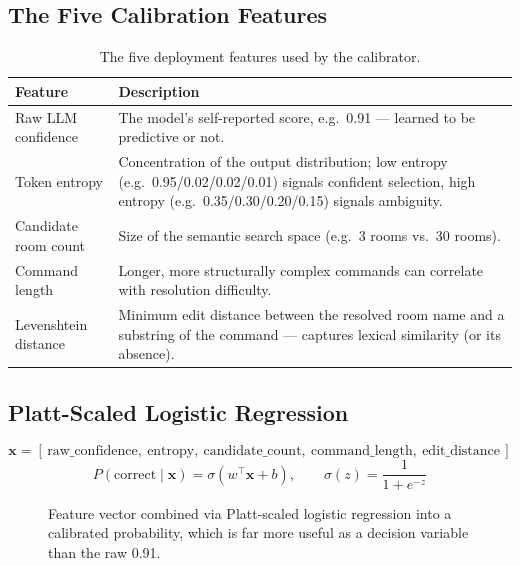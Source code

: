 \documentclass[11pt,a4paper]{article}
\begin{document}
\subsection{The Five Calibration Features}

\begin{table}[h]
\centering
\begin{tabular}{@{}p{3.2cm}p{9.6cm}@{}}
\toprule
\textbf{Feature} & \textbf{Description} \\
\midrule
Raw LLM confidence & The model's self-reported score, e.g.\ 0.91 --- learned to be predictive or not. \\
Token entropy & Concentration of the output distribution; low entropy (e.g.\ 0.95/0.02/0.02/0.01) signals confident selection, high entropy (e.g.\ 0.35/0.30/0.20/0.15) signals ambiguity. \\
Candidate room count & Size of the semantic search space (e.g.\ 3 rooms vs.\ 30 rooms). \\
Command length & Longer, more structurally complex commands can correlate with resolution difficulty. \\
Levenshtein distance & Minimum edit distance between the resolved room name and a substring of the command --- captures lexical similarity (or its absence). \\
\bottomrule
\end{tabular}
\caption{The five deployment features used by the calibrator.}
\end{table}

\subsection{Platt-Scaled Logistic Regression}

\[
\mathbf{x} = [\,\text{raw\_confidence},\ \text{entropy},\ \text{candidate\_count},\ \text{command\_length},\ \text{edit\_distance}\,]
\]
\[
P(\text{correct}\mid \mathbf{x}) = \sigma\!\left(w^\top \mathbf{x} + b\right), \qquad \sigma(z) = \frac{1}{1+e^{-z}}
\]

\begin{figure}[h]
\centering
{}
\caption{Feature vector combined via Platt-scaled logistic regression into a calibrated probability, which is far more useful as a decision variable than the raw 0.91.}
\end{figure}
\end{document}
